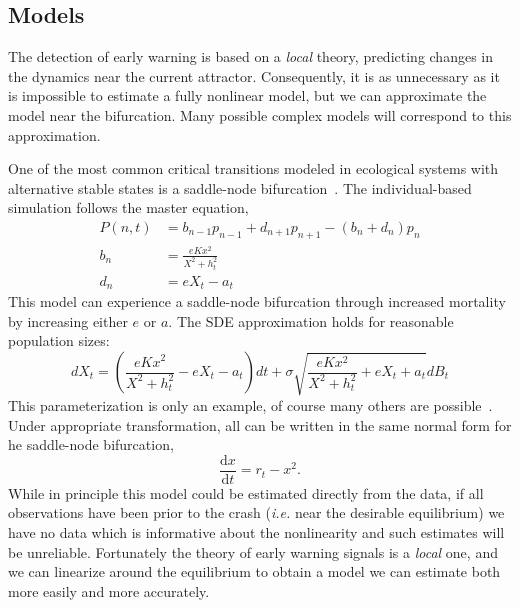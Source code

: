 \documentclass[authoryear,preprint,11pt]{elsarticle}
\newcommand{\ud}{\mathrm{d}}
\begin{document}
\subsection{Models}
The detection of early warning is based on a \emph{local} theory,
predicting changes in the dynamics near the current attractor.
Consequently, it is as unnecessary as it is impossible to estimate a fully nonlinear model,
but we can approximate the model near the bifurcation.  
Many possible complex models will correspond to this approximation.

One of the most common critical transitions modeled in ecological systems with alternative stable states is a saddle-node bifurcation~\citep[\{emph{e.g.}[]{Scheffer2001, Scheffer2009, Guttal2008a, VanNes2007, Biggs2009}.
The individual-based simulation follows the master equation, 
\begin{align}
  P(n,t) &= b_{n-1} p_{n-1} + d_{n+1}p_{n+1} - (b_n+d_n)p_n  \label{master} \\ 
  b_n &= \frac{e K x^2}{X^2 + h_t^2} \\ 
  d_n &= e X_t - a_t   
\end{align}
This model can experience a saddle-node bifurcation through increased mortality by increasing either $e$ or $a$. 
The SDE approximation holds for reasonable population sizes:
\begin{equation}
dX_t = \left( \frac{e K x^2}{X^2 + h_t^2} - e X_t - a_t\right) dt + \sigma \sqrt{ \frac{e K x^2}{X^2 + h_t^2} + e X_t + a_t} dB_t \label{ass}
\end{equation}
This parameterization is only an example, of course many others are possible~\citep{Scheffer2009, Scheffer2001, Strogatz2001a, Guckenheimer1983}. 
Under appropriate transformation, all can be written in the same normal form for he saddle-node bifurcation,
\begin{equation}
\frac{\ud x}{\ud t} = r_t- x^2.
\label{saddle-node}
\end{equation}
While in principle this model could be estimated directly from the data,
if all observations have been prior to the crash (\emph{i.e.} near the desirable equilibrium)
we have no data which is informative about the nonlinearity and such estimates will be unreliable.  
Fortunately the theory of early warning signals is a \emph{local} one, 
and we can linearize around the equilibrium to obtain a model we can estimate both more easily and more accurately.  
\end{document}
